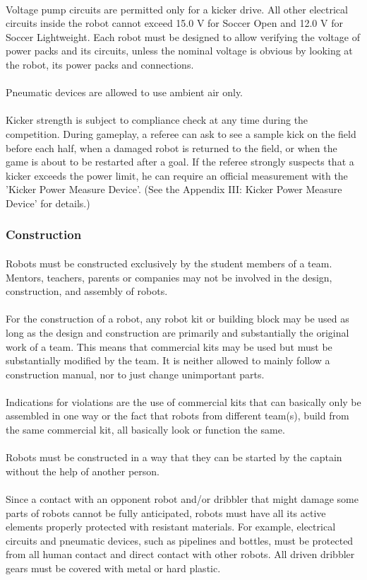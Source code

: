 \documentclass{article}
\newcommand*{\p}{\paragraph{}}
\begin{document}
\p Voltage pump circuits are permitted only for a kicker drive. All other
electrical circuits inside the robot cannot exceed 15.0 V for Soccer Open and
12.0 V for Soccer Lightweight. Each robot must be designed to allow verifying
the voltage of power packs and its circuits, unless the nominal voltage is
obvious by looking at the robot, its power packs and connections.

\p Pneumatic devices are allowed to use ambient air only.

\p Kicker strength is subject to compliance check at any time during the
competition. During gameplay, a referee can ask to see a sample kick on the
field before each half, when a damaged robot is returned to the field, or when
the game is about to be restarted after a goal. If the referee strongly
suspects that a kicker exceeds the power limit, he can require an official
measurement with the 'Kicker Power Measure Device'. (See the Appendix III:
Kicker Power Measure Device' for details.)

\subsubsection{Construction \label{ref-057}}

\p Robots must be constructed exclusively by the student members of a team.
Mentors, teachers, parents or companies may not be involved in the design,
construction, and assembly of robots.

\p For the construction of a robot, any robot kit or building block may be used as
long as the design and construction are primarily and substantially the
original work of a team. This means that commercial kits may be used but must
be substantially modified by the team. It is neither allowed to mainly follow a
construction manual, nor to just change unimportant parts.

\p Indications for violations are the use of commercial kits that can basically
only be assembled in one way or the fact that robots from different team(s),
build from the same commercial kit, all basically look or function the same.

\p Robots must be constructed in a way that they can be started by the captain
without the help of another person.

\p Since a contact with an opponent robot and/or dribbler that might damage some
parts of robots cannot be fully anticipated, robots must have all its active
elements properly protected with resistant materials. For example, electrical
circuits and pneumatic devices, such as pipelines and bottles, must be
protected from all human contact and direct contact with other robots.
All driven dribbler gears must be covered with metal or hard plastic.
\end{document}
